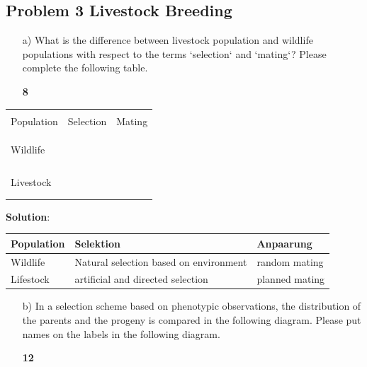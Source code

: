 \documentclass[]{article}
\newcommand{\points}[1]
{\begin{flushright}\textbf{#1}\end{flushright}}
\newcommand{\sol}
{\vspace{2ex}\textbf{Solution}:}
\begin{document}
\clearpage
\pagebreak

\subsection{Problem 3 Livestock
Breeding}\label{problem-3-livestock-breeding}

\begin{enumerate}
\item[a)] What is the difference between livestock population and wildlife populations with respect to the terms `selection` and `mating`? Please complete the following table.
\points{8}
\end{enumerate}

\vspace{3ex}

\begin{center}
\begin{tabular}{p{2cm}|p{5.5cm}|p{5.5cm}}
\hline
& & \\
Population & Selection & Mating \\
& & \\
\hline
& & \\
& & \\
Wildlife &  &  \\ 
& & \\
& & \\
\hline
& & \\
& & \\
Livestock &  &  \\ 
& & \\
& & \\
\hline
\end{tabular}
\end{center}

\vspace{5ex} \sol

\vspace{3ex}

\begin{longtable}[]{@{}lll@{}}
\toprule
Population & Selektion & Anpaarung\tabularnewline
\midrule
\endhead
Wildlife & Natural selection based on environment & random
mating\tabularnewline
Lifestock & artificial and directed selection & planned
mating\tabularnewline
\bottomrule
\end{longtable}

\clearpage
\pagebreak

\begin{enumerate}
\item[b)] In a selection scheme based on phenotypic observations, the distribution of the parents and the progeny is compared in the following diagram. Please put names on the labels in the following diagram.
\points{12}
\end{enumerate}
\end{document}
